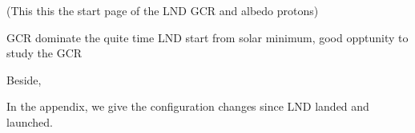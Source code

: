 (This this the start page of the LND GCR and albedo protons)


GCR dominate the quite time
LND start from solar minimum, good opptunity to study the GCR

Beside,

In the appendix, we give the configuration changes since LND landed and launched. 


